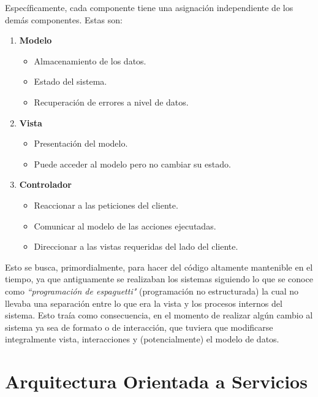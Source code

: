     Específicamente, cada componente tiene una asignación independiente de los demás componentes. Estas son:
    
    \begin{enumerate}
        \item \textbf{Modelo}
            \begin{itemize}
                \item Almacenamiento de los datos.
                \item Estado del sistema.
                \item Recuperación de errores a nivel de datos.
            \end{itemize}
        \item \textbf{Vista}
            \begin{itemize}
                \item Presentación del modelo.
                \item Puede acceder al modelo pero no cambiar su estado.
            \end{itemize}
        \item \textbf{Controlador}
            \begin{itemize}
                \item Reaccionar a las peticiones del cliente.
                \item Comunicar al modelo de las acciones ejecutadas.
                \item Direccionar a las vistas requeridas del lado del cliente.
            \end{itemize}
    \end{enumerate}
    
    Esto se busca, primordialmente, para hacer del código altamente mantenible en el tiempo, ya que antiguamente se realizaban los sistemas siguiendo lo que se conoce como \textit{``programación de espaguetti"} (programación no estructurada) la cual no llevaba una separación entre lo que era la vista y los procesos internos del sistema. Esto traía como consecuencia, en el momento de realizar algún cambio al sistema ya sea de formato o de interacción, que tuviera que modificarse integralmente vista, interacciones y (potencialmente) el modelo de datos.
    
    \section{Arquitectura Orientada a Servicios}
    \label{teorico-soa}
    
